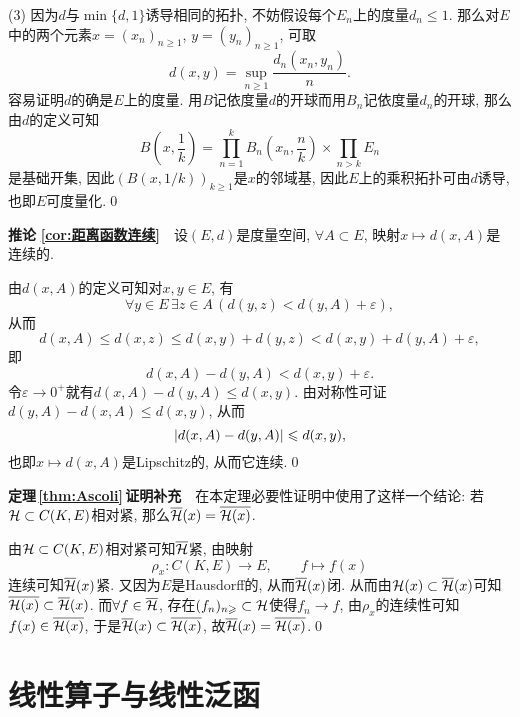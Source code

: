 \begin{Proof}
    (3) 因为$ d $与$ \min\{d,1\} $诱导相同的拓扑, 不妨假设每个$ E_n $上的度量$ d_n\leqslant 1 $. 那么对$ E $中的两个元素$ x=(x_n)_{n\geqslant 1} $, $ y=(y_n)_{n\geqslant 1} $, 可取
    \[
    d(x,y)=\sup_{n\geqslant 1}\frac{d_n(x_n,y_n)}{n}.
    \]
    容易证明$ d $的确是$ E $上的度量. 用$ B $记依度量$ d $的开球而用$ B_n $记依度量$ d_n $的开球, 那么由$ d $的定义可知
    \[
    B\left(x,\frac{1}{k}\right)=\prod_{n=1}^kB_n\left(x_n,\frac{n}{k}\right)\times\prod_{n>k}E_n
    \]
    是基础开集, 因此$ (B(x,1/k))_{k\geqslant 1} $是$ x $的邻域基, 因此$ E $上的乘积拓扑可由$ d $诱导, 也即$ E $可度量化.\qed
         
    \end{Proof}
    
    \textbf{推论\,\,\ref{cor:距离函数连续}}\ \ 设$ (E,d) $是度量空间, $ \forall A\subset E $, 映射$ x\mapsto d(x,A) $是连续的.
    \begin{Proof}
    由$ d(x,A) $的定义可知对$ x,y\in E $, 有
    \[
    \forall y\in E\,\exists z\in A\,(d(y,z)<d(y,A)+\varepsilon),
    \]
    从而
    \[
    d(x,A)\leqslant d(x,z)\leqslant d(x,y)+d(y,z)<d(x,y)+d(y,A)+\varepsilon,
    \]
    即
    \[
    d(x,A)-d(y,A)<d(x,y)+\varepsilon.
    \]
    令$ \varepsilon\to 0^+ $就有$ d(x,A)-d(y,A)\leqslant d(x,y) $. 由对称性可证$ d(y,A)-d(x,A)\leqslant d(x,y) $, 从而
    \[
    \left| d(x,A)-d(y,A) \right| \leqslant d(x,y),
    \]
    也即$ x\mapsto d(x,A) $是Lipschitz的, 从而它连续.\qed
    \end{Proof}
    
    \textbf{定理\,\ref{thm:Ascoli}\,证明补充}\ \ 在本定理必要性证明中使用了这样一个结论: 若$ \mathcal{H}\subset C(K,E) $相对紧, 那么$ \overline{\mathcal{H}}(x)=\overline{\mathcal{H}(x)} $.
    \begin{Proof}
    由$ \mathcal{H}\subset C(K,E) $相对紧可知$ \overline{\mathcal{H}} $紧, 由映射
    \[
    \rho_x : C(K,E)\to E,\qquad f\mapsto f(x)
    \]
    连续可知$ \overline{\mathcal{H}}(x) $紧. 又因为$ E $是Hausdorff的, 从而$ \overline{\mathcal{H}}(x) $闭. 从而由$ \mathcal{H}(x)\subset\overline{\mathcal{H}}(x) $可知$ \overline{\mathcal{H}(x)}\subset\overline{\mathcal{H}}(x) $. 而$ \forall f\in\overline{\mathcal{H}} $, 存在$ (f_n)_{n\geqslant}\subset\mathcal{H} $使得$ f_n\to f $, 由$ \rho_x $的连续性可知$ f(x)\in\overline{\mathcal{H}(x)} $, 于是$ \overline{\mathcal{H}}(x)\subset\overline{\mathcal{H}(x)} $, 故$ \overline{\mathcal{H}}(x)=\overline{\mathcal{H}(x)} $.\qed
    \end{Proof}
    
    \section{线性算子与线性泛函}
    
